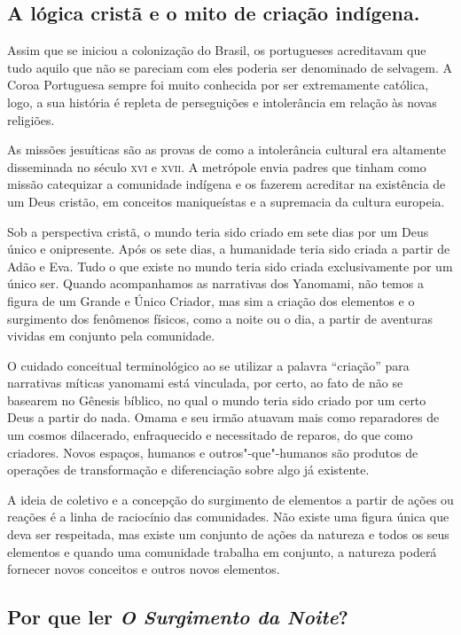 \documentclass[12pt]{extarticle}
\begin{document}
{\subsection{A lógica cristã e o mito de criação indígena.}

Assim que se iniciou a colonização do Brasil, os portugueses acreditavam
que tudo aquilo que não se pareciam com eles poderia ser denominado de
selvagem. A Coroa Portuguesa sempre foi muito conhecida por ser
extremamente católica, logo, a sua história é repleta de perseguições e
intolerância em relação às novas religiões.

As missões jesuíticas são as provas de como a intolerância cultural era
altamente disseminada no século \textsc{xvi} e \textsc{xvii}. A metrópole envia padres que
tinham como missão catequizar a comunidade indígena e os fazerem
acreditar na existência de um Deus cristão, em conceitos maniqueístas e a
supremacia da cultura europeia.

Sob a perspectiva cristã, o mundo teria sido criado em sete dias por um Deus
único e onipresente. Após os sete dias, a humanidade teria sido criada a partir
de Adão e Eva. Tudo o que existe no mundo teria sido criada exclusivamente por
um único ser. Quando acompanhamos as narrativas dos Yanomami, não temos
a figura de um Grande e Único Criador, mas sim a criação dos elementos
e o surgimento dos fenômenos físicos, como a noite ou o dia, a partir de
aventuras vividas em conjunto pela comunidade.

O cuidado conceitual terminológico ao se utilizar a palavra “criação” para 
narrativas míticas yanomami está vinculada, por certo, ao fato de não se 
basearem no Gênesis bíblico, no qual o mundo teria sido criado por um certo 
Deus a partir do nada. Omama e seu irmão atuavam mais como reparadores de um 
cosmos dilacerado, enfraquecido e necessitado de reparos, do que como criadores. 
Novos espaços, humanos e outros"-que"-humanos são produtos de operações de 
transformação e diferenciação sobre algo já existente. 

A ideia de coletivo e a concepção do surgimento de elementos a partir de
ações ou reações é a linha de raciocínio das comunidades. Não existe uma
figura única que deva ser respeitada, mas existe um conjunto de ações da
natureza e todos os seus elementos e quando uma comunidade trabalha em
conjunto, a natureza poderá fornecer novos conceitos e outros novos
elementos.

\subsection{Por que ler \emph{O Surgimento da Noite}?}

}
\end{document}

